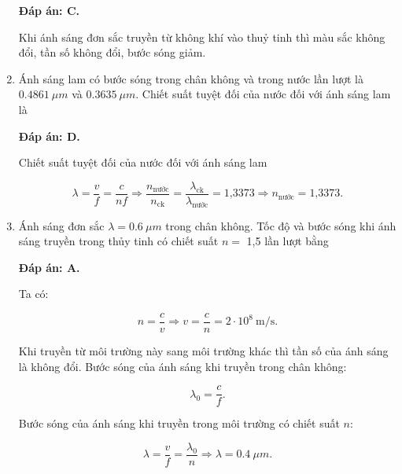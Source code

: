 \begin{enumerate}[label=\bfseries Câu \arabic*:]
	\loigiai
	{		\textbf{Đáp án: C.}
		
		Khi ánh sáng đơn sắc truyền từ không khí vào thuỷ tinh thì màu sắc không đổi, tần số không đổi, bước sóng giảm. 
		
	}
		\item {} 
	\cauhoi
	{
		Ánh sáng lam có bước sóng trong chân không và trong nước lần lượt là $\SI{0,4861}{\mu m}$ và $\SI{0,3635}{\mu m}$. Chiết suất tuyệt đối của nước đối với ánh sáng lam là
		
	}
	
	\loigiai
	{		\textbf{Đáp án: D.}
		
		Chiết suất tuyệt đối của nước đối với ánh sáng lam
		
		$$\lambda = \dfrac{v}{f} = \dfrac{c}{nf} \Rightarrow \dfrac{n_\text{nước}}{n_\text{ck}}= \dfrac{\lambda_\text{ck}}{\lambda_\text{nước}} = \text{1,3373} \Rightarrow n_\text{nước} = \text{1,3373}.$$
		
	}
		\item {} 
	\cauhoi
	{Ánh sáng đơn sắc $\lambda = \SI{0,6}{\mu m}$ trong chân không. Tốc độ và bước sóng khi ánh sáng truyền trong thủy tinh có chiết suất $n =$ 1,5 lần lượt bằng
		
		
	}
	
	\loigiai
	{		\textbf{Đáp án: A.}
		
		Ta có:
		
		$$ n =\dfrac{c}{v}  \Rightarrow v = \dfrac{c}{n} = 2\cdot 10^8\ \text{m/s}.$$
		
		Khi truyền từ môi trường này sang môi trường khác thì tần số của ánh sáng là không đổi. Bước sóng của ánh sáng khi truyền trong chân không:
		
		$$\lambda_0 = \dfrac{c}{f}.$$
		
		Bước sóng của ánh sáng khi truyền trong môi trường có chiết suất $n$:
		
		$$\lambda = \dfrac{v}{f} = \dfrac{\lambda_0}{n} \Rightarrow \lambda = \SI{0,4}{\mu m}.$$
		
		
	}
	
\end{enumerate}











